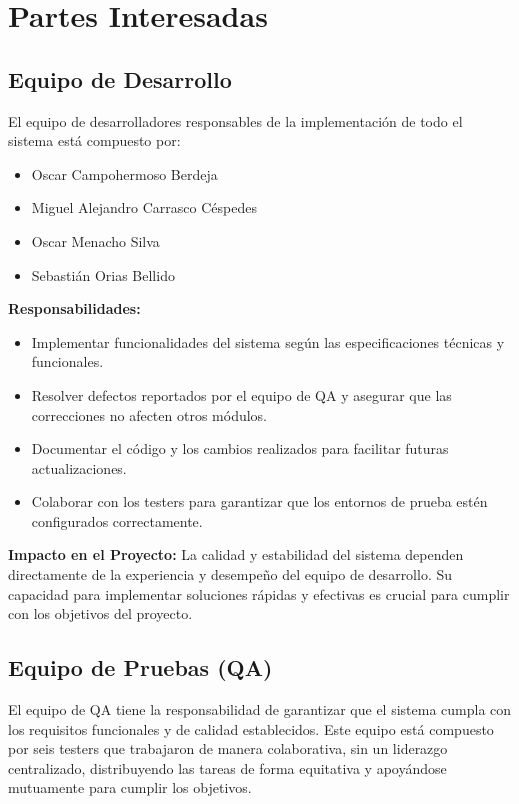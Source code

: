 \documentclass[stu, 12pt, letterpaper, donotrepeattitle, floatsintext, natbib]{apa7}
\begin{document}
\section{\large Partes Interesadas}

\subsection{Equipo de Desarrollo} 
El equipo de desarrolladores responsables de la implementación de todo el sistema está compuesto por:
    \begin{itemize}
        \item Oscar Campohermoso Berdeja
        \item Miguel Alejandro Carrasco Céspedes
        \item Oscar Menacho Silva
        \item Sebastián Orias Bellido
    \end{itemize}

    \textbf{Responsabilidades:}
    \begin{itemize}
        \item Implementar funcionalidades del sistema según las especificaciones técnicas y funcionales.
        \item Resolver defectos reportados por el equipo de QA y asegurar que las correcciones no afecten otros módulos.
        \item Documentar el código y los cambios realizados para facilitar futuras actualizaciones.
        \item Colaborar con los testers para garantizar que los entornos de prueba estén configurados correctamente.
    \end{itemize}

    \textbf{Impacto en el Proyecto:}  
    La calidad y estabilidad del sistema dependen directamente de la experiencia y desempeño del equipo de desarrollo. Su capacidad para implementar soluciones rápidas y efectivas es crucial para cumplir con los objetivos del proyecto.


\subsection{Equipo de Pruebas (QA)} 
El equipo de QA tiene la responsabilidad de garantizar que el sistema cumpla con los requisitos funcionales y de calidad establecidos. Este equipo está compuesto por seis testers que trabajaron de manera colaborativa, sin un liderazgo centralizado, distribuyendo las tareas de forma equitativa y apoyándose mutuamente para cumplir los objetivos.
\end{document}
